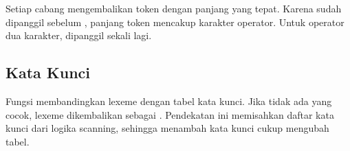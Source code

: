 
Setiap cabang mengembalikan token dengan panjang yang tepat. Karena
 sudah dipanggil sebelum , panjang token
mencakup karakter operator. Untuk operator dua karakter,
 dipanggil sekali lagi.

\subsection{Kata Kunci}

Fungsi  membandingkan lexeme dengan tabel kata
kunci. Jika tidak ada yang cocok, lexeme dikembalikan sebagai
. Pendekatan ini memisahkan daftar kata kunci dari
logika scanning, sehingga menambah kata kunci cukup mengubah tabel.
